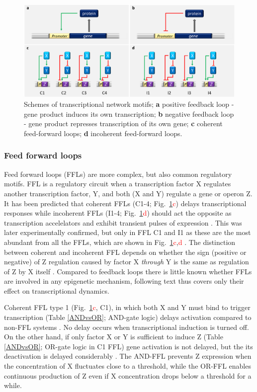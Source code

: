 \begin{figure}[ht!]
  \centering
  \includegraphics[scale=0.29]{text/Pictures/TxnMotifs.png}
	\caption{Schemes of transcriptional network motifs; \textbf{a} positive feedback loop - gene product induces its own transcription; \textbf{b} negative feedback loop - gene product represses transcription of its own gene; \textbf{c} coherent feed-forward loops; \textbf{d} incoherent feed-forward loops.}
	\label{motifs}
\end{figure}

\subsubsection{Feed forward loops}
Feed forward loops (FFLs) are more complex, but also common regulatory motifs.
FFL is a regulatory circuit when a transcription factor X regulates another transcription factor, Y, and both (X and Y) regulate a gene or operon Z.
It has been predicted that coherent FFLs  (C1-4; Fig.~\ref{motifs}\textcolor{red}{c}) delays transcriptional responses while incoherent FFLs  (I1-4; Fig.~\ref{motifs}\textcolor{red}{d}) should act the opposite as transcription accelelators and exhibit transient pulses of expression \cite{mangan2003structure}.
This was later experimentally confirmed, but only in FFL C1 and I1 as these are the most abundant from all the FFLs, which are shown in Fig.~\ref{motifs}\textcolor{red}{c},\textcolor{red}{d} \cite{mangan2003coherent, kalir2005coherent, mangan2006incoherent}.
The distinction between coherent and incoherent FFL depends on whether the sign (positive or negative) of Z regulation caused by factor X \textit{through} Y is the same as regulation of Z by X itself \cite{shen2002network, mangan2003structure}.
Compared to feedback loops there is little known whether FFLs are involved in any epigenetic mechanism, following text thus covers only their effect on transcriptional dynamics.

Coherent FFL type 1 (Fig.~\ref{motifs}\textcolor{red}{c}, C1), in which both X and Y must bind to trigger transcription (Table \ref{ANDvsOR}; AND-gate logic) delays activation compared to non-FFL systems \cite{mangan2003coherent}.
No delay occurs when transcriptional induction is turned off.
On the other hand, if only factor X or Y is sufficient to induce Z (Table \ref{ANDvsOR}; OR-gate logic in C1 FFL) gene activation is not delayed, but the its deactivation is delayed considerably \cite{kalir2005coherent}.
The AND-FFL prevents Z expression when the concentration of X fluctuates close to a threshold, while the OR-FFL enables continuous production of Z even if X concentration drops below a threshold for a while.

